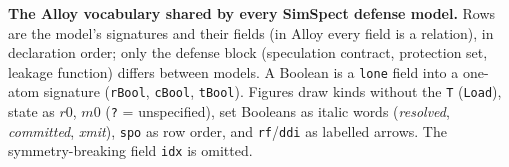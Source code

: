\textbf{The Alloy vocabulary shared by every SimSpect defense model.} Rows are the model's signatures and their fields (in Alloy every field is a relation), in declaration order; only the defense block (speculation contract, protection set, leakage function) differs between models. A Boolean is a \texttt{lone} field into a one-atom signature (\texttt{rBool}, \texttt{cBool}, \texttt{tBool}). Figures draw kinds without the \texttt{T} (\texttt{Load}), state as $r0$, $m0$ (\texttt{?} = unspecified), set Booleans as italic words (\textit{resolved}, \textit{committed}, \textit{xmit}), \texttt{spo} as row order, and \texttt{rf}/\texttt{ddi} as labelled arrows. The symmetry-breaking field \texttt{idx} is omitted.
